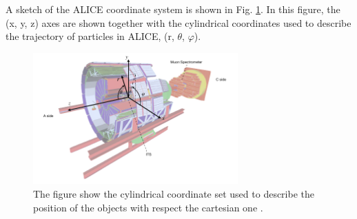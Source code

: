 \documentclass[12pt,a4paper]{book}
\begin{document}
	A sketch of the ALICE coordinate system is shown in Fig. \ref{fig:ALICE_cordinates}. In this figure, the (x, y, z) axes are shown together with the cylindrical coordinates used to describe the trajectory of particles in ALICE, (r, $\theta$, $\varphi$).
	\begin{figure}[h]
		\centering
		\includegraphics[width=0.7\textwidth]{pictures/ALICE_cordinates.png}
		\caption{The figure show the cylindrical coordinate set used to describe the position of the objects with respect the cartesian one \cite{Herrmann:2920632}.}
		\label{fig:ALICE_cordinates}
	\end{figure}
	
\end{document}
